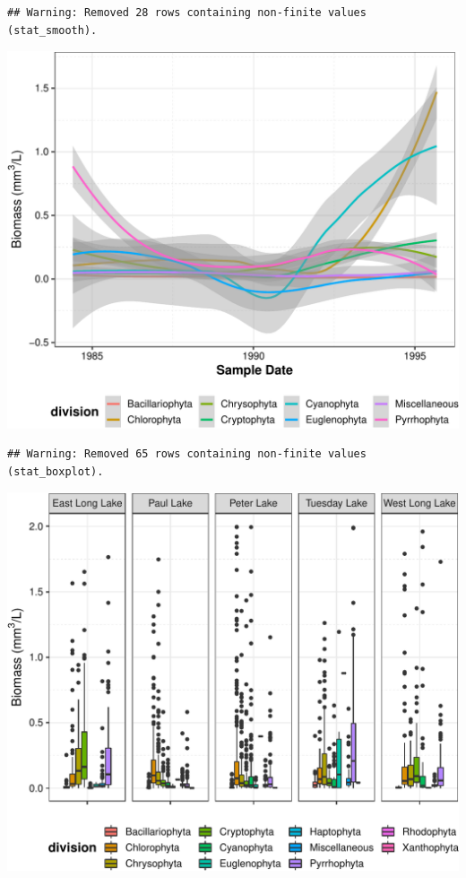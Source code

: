 \documentclass[12pt,]{article}
\begin{document}
\begin{verbatim}
## Warning: Removed 28 rows containing non-finite values (stat_smooth).
\end{verbatim}

\includegraphics{Chen_ENV872_Project_files/figure-latex/Figure 2-1.pdf}

\begin{verbatim}
## Warning: Removed 65 rows containing non-finite values (stat_boxplot).
\end{verbatim}

\includegraphics{Chen_ENV872_Project_files/figure-latex/Figure 3-1.pdf}
\newpage
\end{document}
